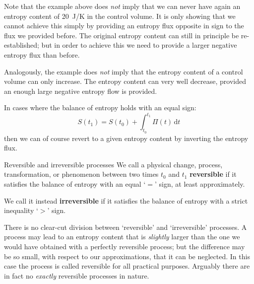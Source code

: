 \documentclass[a4paper,12pt,%
onecolumn,oneside,%
british%
]{memoir}
\newcommand*{\di}{\mathrm{d}}%
\renewcommand*{\|}[1][]{\nonscript\:#1\vert\nonscript\:\mathopen{}}
\newcommand*{\yti}{t_{0}}
\newcommand*{\ytf}{t_{1}}
\newcommand*{\dt}{\di t}
\newcommand*{\yS}{S}
\newcommand*{\yB}{\varPi}
\begin{document}
\begin{warning}
  Note that the example above does \emph{not} imply that we can never have again an entropy content of \qty{20}{J/K} in the control volume. It is only showing that we cannot achieve this simply by providing an entropy flux opposite in sign to the flux we provided before. The original entropy content can still in principle be re-established; but in order to achieve this we need to provide a larger negative entropy flux than before.

Analogously, the example does \emph{not} imply that the entropy content of a control volume can only increase. The entropy content can very well decrease, provided an enough large negative entropy flow is provided.
\end{warning}

\medskip

In cases where the balance of entropy holds with an equal sign:
\begin{equation*}
  \yS(\ytf) = \yS(\yti) + \int_{\yti}^{\ytf}\!\!\yB(t)\,\dt
\end{equation*}
then we can of course revert to a given entropy content by inverting the entropy flux.

\begin{definition}{Reversible and irreversible processes}\label{def:reversible}
  We call a physical change, process, transformation, or phenomenon between two times $\yti$ and $\ytf$ \textbf{reversible} if it satisfies the balance of entropy with an equal \enquote*{$=$} sign, at least approximately.

  \medskip

  We call it instead \textbf{irreversible} if it satisfies the balance of entropy with a strict inequality \enquote*{$>$} sign.

  \medskip

  There is no clear-cut division between \enquote*{reversible} and \enquote*{irreversible} processes. A process may lead to an entropy content that is \emph{slightly} larger than the one we would have obtained with a perfectly reversible process; but the difference may be so small, with respect to our approximations, that it can be neglected. In this case the process is called reversible for all practical purposes. Arguably there are in fact no \emph{exactly} reversible processes in nature.
\end{definition}

\bigskip
\end{document}
